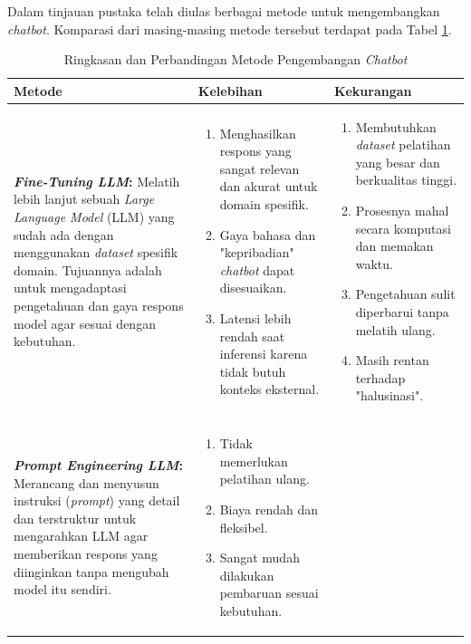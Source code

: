 Dalam tinjauan pustaka telah diulas berbagai metode untuk mengembangkan \textit{chatbot}.
Komparasi dari masing-masing metode tersebut terdapat pada Tabel \ref{tab:method-comparision}.

\begin{table}
	\centering
	\caption{Ringkasan dan Perbandingan Metode Pengembangan \textit{Chatbot}}
	\label{tab:method-comparision}
	\begin{tabularx}{\textheight}{|X|p{8.5cm}|p{8.5cm}|}
		\hline
		\textbf{Metode} & \textbf{Kelebihan} & \textbf{Kekurangan} \\
		\hline\hline

		\textbf{\textit{Fine-Tuning LLM}: }
		Melatih lebih lanjut sebuah \textit{Large Language Model} (LLM) yang sudah ada dengan menggunakan \textit{dataset} spesifik domain.
		Tujuannya adalah untuk mengadaptasi pengetahuan dan gaya respons model agar sesuai dengan kebutuhan.
		                &
		\begin{enumerate}[leftmargin=*]
			\item Menghasilkan respons yang sangat relevan dan akurat untuk domain spesifik.
			\item Gaya bahasa dan "kepribadian" \textit{chatbot} dapat disesuaikan.
			\item Latensi lebih rendah saat inferensi karena tidak butuh konteks eksternal.
		\end{enumerate}
		                &
		\begin{enumerate}[leftmargin=*]
			\item Membutuhkan \textit{dataset} pelatihan yang besar dan berkualitas tinggi.
			\item Prosesnya mahal secara komputasi dan memakan waktu.
			\item Pengetahuan sulit diperbarui tanpa melatih ulang.
			\item Masih rentan terhadap "halusinasi".
		\end{enumerate}
		\\
		\hline
		\textbf{\textit{Prompt Engineering LLM}: }
		Merancang dan menyusun instruksi (\textit{prompt}) yang detail dan terstruktur untuk mengarahkan LLM agar memberikan respons yang diinginkan tanpa mengubah model itu sendiri.
		                &
		\begin{enumerate}[leftmargin=*]
			\item Tidak memerlukan pelatihan ulang.
			\item Biaya rendah dan fleksibel.
			\item Sangat mudah dilakukan pembaruan sesuai kebutuhan.

\end{enumerate}
\end{tabularx}
\end{table}
